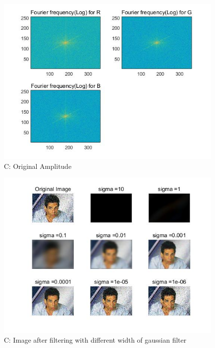 \documentclass[12pt,letterpaper]{article}
\begin{document}
\begin{figure}[h]
	\caption{C: Original Amplitude}
	\centering
	\includegraphics[width=1\textwidth]{Part1C1}
\end{figure}
\begin{figure}[h]
	\caption{C: Image after filtering with different width of gaussian filter}
	\centering
	\includegraphics[width=1.4\textwidth]{Part1C2}
\end{figure}
\end{document}
